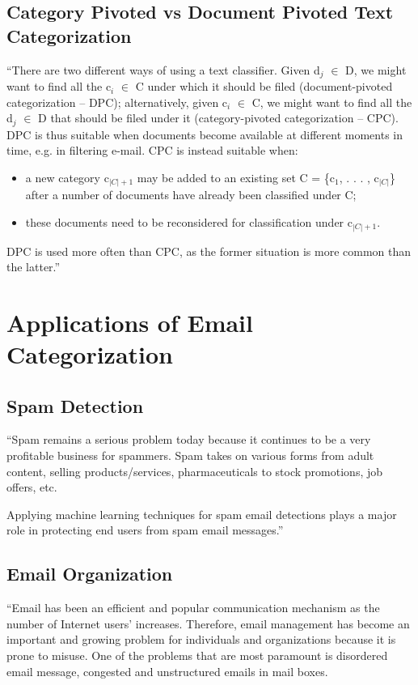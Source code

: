 \subsection{Category Pivoted vs Document Pivoted Text Categorization}
``There are two different ways of using a text classifier. Given d$_{j}$ $\in$ D, 
we might want to find all the c$_{i}$ $\in$ C under which it should be filed 
(document-pivoted categorization – DPC); alternatively, given c$_{i}$ $\in$ C, 
we might want to find all the d$_{j}$ $\in$ D that should be filed under it 
(category-pivoted categorization – CPC). DPC is thus suitable when documents 
become available at different moments in time, e.g. in filtering e-mail. CPC 
is instead suitable when: 
\begin{itemize}
  \item a new category c$_{|C|+1}$ may be added to an existing set 
  C = \{c$_{1}$, . . . , c$_{|C|}$\} after a number of documents have 
  already been classified under C;
  \item these documents need to be reconsidered for classification under c$_{|C|+1}$.
\end{itemize}
DPC is used more often than CPC, as the former situation is more common than 
the latter.'' \cite{Sebastiani2002}

\section{Applications of Email Categorization}
\label{sec:app_email_categ}

\subsection{Spam Detection}
``Spam remains a serious problem today because it continues to be a very 
profitable business for spammers. Spam takes on various forms from adult 
content, selling products/services, pharmaceuticals to stock promotions, 
job offers, etc.

Applying machine learning techniques for spam email detections plays a major 
role in protecting end users from spam email messages.''\cite{peifeng2007}

\subsection{Email Organization}
``Email has been an efficient and popular communication mechanism as the 
number of Internet users’ increases. Therefore, email management has 
become an important and growing problem for individuals and organizations 
because it is prone to misuse. One of the problems that are most paramount 
is disordered email message, congested and unstructured emails in mail 
boxes.

